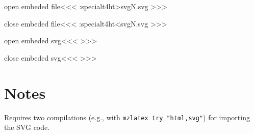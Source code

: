 \<open embeded file\><<<
\ht:special{t4ht>\jobname\:svgN.svg}%
>>>

\<close embeded file\><<<
\ht:special{t4ht<\jobname\:svgN.svg}%
>>>

\<open embeded svg\><<<
%
>>>

\<close embeded svg\><<<
%
>>>






\chapter{Notes}


Requires two compilations (e.g., with \verb!mzlatex try "html,svg"!)
for importing the SVG code.




\endinput

